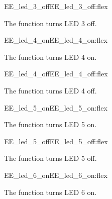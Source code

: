 \begin{function_nopb2}{EE\_led\_3\_off}{EE_led_3_off:flex}
  
  \begin{fundescription}
    The function turns LED 3 off.
  \end{fundescription}
\end{function_nopb2}

\begin{function_nopb2}{EE\_led\_4\_on}{EE_led_4_on:flex}
  
  \begin{fundescription}
    The function turns LED 4 on.
  \end{fundescription}
\end{function_nopb2}

\begin{function_nopb2}{EE\_led\_4\_off}{EE_led_4_off:flex}
  
  \begin{fundescription}
    The function turns LED 4 off.
  \end{fundescription}
\end{function_nopb2}

\begin{function_nopb2}{EE\_led\_5\_on}{EE_led_5_on:flex}
  
  \begin{fundescription}
    The function turns LED 5 on.
  \end{fundescription}
\end{function_nopb2}

\begin{function_nopb2}{EE\_led\_5\_off}{EE_led_5_off:flex}
  
  \begin{fundescription}
    The function turns LED 5 off.
  \end{fundescription}
\end{function_nopb2}

\begin{function_nopb2}{EE\_led\_6\_on}{EE_led_6_on:flex}
  
  \begin{fundescription}
    The function turns LED 6 on.
  \end{fundescription}
\end{function_nopb2}


